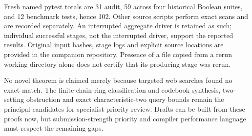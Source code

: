 \documentclass[11pt]{article}
\theoremstyle{remark}
\begin{document}
Fresh named pytest totals are 31 audit, 59 across four historical Boolean suites,
and 12 benchmark tests, hence 102. Other source scripts perform exact scans and
are recorded separately. An interrupted aggregate driver is retained as such;
individual successful stages, not the interrupted driver, support the reported
results. Original input hashes, stage logs and explicit source locations are
provided in the companion repository. Presence of a file copied from a rerun
working directory alone does not certify that its producing stage was rerun.

No novel theorem is claimed merely because targeted web searches found no exact
match. The finite-chain-ring classification and codebook synthesis, two-setting
obstruction and exact characteristic-two query bounds remain the principal
candidates for specialist priority review. Drafts can be built from these
proofs now, but submission-strength priority and compiler performance language
must respect the remaining gaps.

\end{document}
